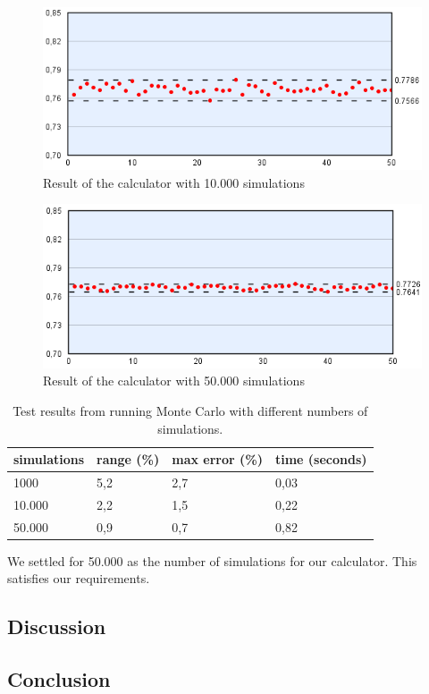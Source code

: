 \begin{figure}
  \center
    \includegraphics[scale=0.775]{images/MonteCarlo/10k.png}
  \caption{Result of the calculator with 10.000 simulations \label{fig:mc10}}
\end{figure}

\begin{figure}
  \center
    \includegraphics[scale=0.775]{images/MonteCarlo/50k.png}
  \caption{Result of the calculator with 50.000 simulations \label{fig:mc50}}
\end{figure}

\vspace{4mm}
\begin{table}
  \center
  \begin{tabular}{ | l | l | l | l | }
    \hline
    simulations & range (\%) & max error (\%) & time (seconds) \\
    \hline                       
    1000 & 5,2 & 2,7 & 0,03 \\
    10.000 & 2,2 & 1,5 & 0,22\\
    50.000 & 0,9 & 0,7 & 0,82\\
  \hline  
  \end{tabular}
  \caption{Test results from running Monte Carlo with different numbers of simulations. \label{tab:mc-total}}
\end{table}
\vspace{4mm}

We settled for 50.000 as the number of simulations for our calculator. This satisfies our requirements.

\subsection{Discussion}

\subsection{Conclusion}